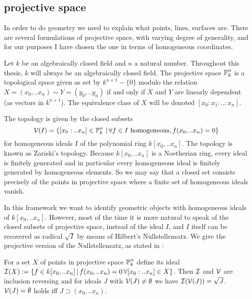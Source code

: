 \subsection{projective space}

In order to do geometry we need to explain what points, lines, surfaces are.
There are several formulations of projective space, with varying degree of generality, and for our purposes I have chosen the one in terms of homogeneous coordinates.

Let $k$ be an algebraically closed field and $n$ a natural number.
Throughout this thesis, $k$ will always be an algebraically closed field.
The projective space $\operatorname{\mathbb P}^n_k$ is a topological space given as set by  $k^{n+1} - \{ 0 \}$ modulo the relation $X=(x_0,..x_n) \sim Y=(y_0,..y_n)$ if and only if $X$ and $Y$ are linearly dependent (as vectors in $k^{n+1}$). The equivalence class of $X$ will be denoted $[x_0:x_1:..:x_n]$.

The topology is given by the closed subsets
\begin{equation}
\operatorname{\mathcal V}(I) =
\left\lbrace [x_0:..x_n] \in \operatorname{\mathbb P}^n_k\,|\,  \forall f\in I \text{ homogeneous}, f(x_0,..x_n) = 0\right\rbrace
\end{equation}
for homogeneous ideals $I$ of the polynomial ring $k[x_0,..x_n]$.
The topology is known as Zariski's topology.
Because $k[x_0,..x_n]$ is a Noetherian ring, every ideal is finitely generated and in particular every homogeneous ideal is finitely generated by homogeneous elements.
So we may say that a closed set consists precisely of the points in projective space where a finite set of homogeneous ideals vanish.

In this framework we want to identify geometric objects with homogeneous ideals of $k[x_0,..x_n]$.
However, most of the time it is more natural to speak of the closed subsets of projective space, instead of the ideal $I$, and $I$ itself can be recovered as radical $\sqrt{I}$ by means of Hilbert's Nullstellensatz.
We give the projective version of the Nullstellensatz, as stated in \cite[section 5.3]{reid1988undergraduate}:

\begin{theorem}
For a set $X$ of points in projective space $\operatorname{\mathbb P}^n_k$ define its ideal $\operatorname{\mathcal I}(X) := \left\lbrace f \in k[x_0,..x_n]\,|\, f(x_0,..x_n) = 0\,\forall [x_0:..x_n] \in X\right\rbrace$.
Then $\operatorname{\mathcal I}$ and $\operatorname{\mathcal V}$ are inclusion reversing and for ideals $J$ with $\operatorname{\mathcal V}(J) \neq \emptyset$ we have $\operatorname{\mathcal I}(\operatorname{\mathcal V}(J)) = \sqrt{J}$.
$\operatorname{\mathcal V}(J) = \emptyset$ holds iff $J \supset (x_0,..x_n)$.
\end{theorem}

